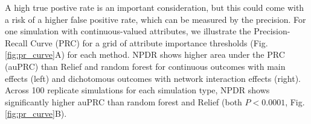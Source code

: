 \documentclass{bioinfo}
\begin{document}
A high true postive rate is an important consideration, but this could come with a risk of a higher false positive rate, which can be measured by the precision. 
For one simulation with continuous-valued attributes, we illustrate the Precision-Recall Curve (PRC) for a grid of attribute importance thresholds (Fig. \ref{fig:pr_curve}A) for each method. NPDR shows higher area under the PRC (auPRC) than Relief and random forest for continuous outcomes with main effects (left) and dichotomous outcomes with network interaction effects (right).
Across 100 replicate simulations for each simulation type, NPDR shows significantly higher auPRC than random forest and Relief (both $P < 0.0001$, Fig. \ref{fig:pr_curve}B). 
\end{document}
